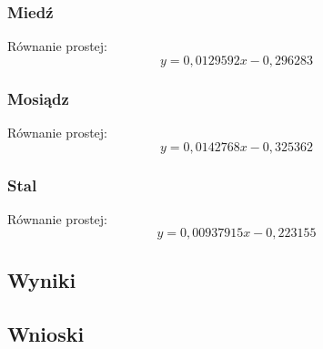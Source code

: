 \documentclass[a4paper, 11pt]{article}
\begin{document}

\subsubsection{Miedź}\label{sub:miedz} %
Równanie prostej:
\[
	y = 0,0129592x - 0,296283
\]



\subsubsection{Mosiądz}\label{sub:mosiadz} %
Równanie prostej:
\[
	y = 0,0142768x - 0,325362
\]

\subsubsection{Stal}\label{sub:stal} %
Równanie prostej:
\[
	y = 0,00937915x - 0,223155
\]

\subsection{Wyniki}\label{sub:wyniki} %


\subsection{Wnioski}\label{sub:wnioski} %

\end{document}
